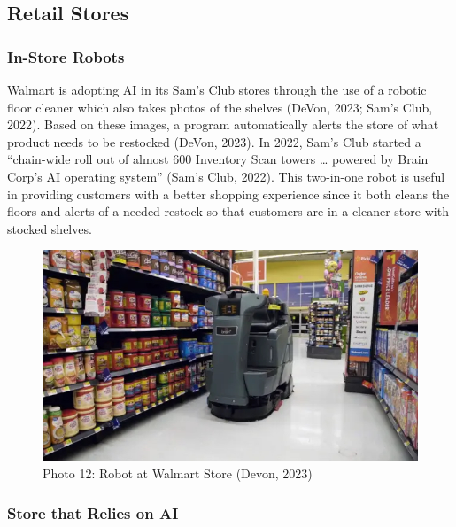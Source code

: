 \documentclass[
]{article}
\begin{document}
\hypertarget{retail-stores}{%
\subsection{Retail Stores}\label{retail-stores}}

\hypertarget{in-store-robots}{%
\subsubsection{In-Store Robots}\label{in-store-robots}}

Walmart is adopting AI in its Sam's Club stores through the use of a robotic floor cleaner which also takes photos of the shelves (DeVon, 2023; Sam's Club, 2022). Based on these images, a program automatically alerts the store of what product needs to be restocked (DeVon, 2023). In 2022, Sam's Club started a ``chain-wide roll out of almost 600 Inventory Scan towers \ldots{} powered by Brain Corp's AI operating system'' (Sam's Club, 2022). This two-in-one robot is useful in providing customers with a better shopping experience since it both cleans the floors and alerts of a needed restock so that customers are in a cleaner store with stocked shelves.

\begin{figure}
\centering
\includegraphics{Walmart_Brain_Corp_Robot.jpg}
\caption{Photo 12: Robot at Walmart Store (Devon, 2023)}
\end{figure}

\hypertarget{store-that-relies-on-ai}{%
\subsubsection{Store that Relies on AI}\label{store-that-relies-on-ai}}
\end{document}
